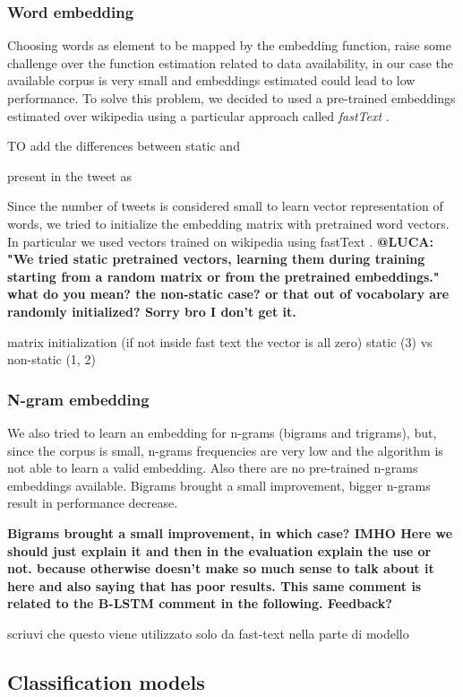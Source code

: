 \subsubsection{Word embedding}
Choosing words as element to be mapped by the embedding function, raise some challenge over the function estimation related to data availability, in our case the available corpus is very small and embeddings estimated could lead to low performance.
To solve this problem, we decided to used a pre-trained embeddings estimated over wikipedia using a particular approach called \emph{fastText} \cite{bojanowski2016enriching}.

TO add the differences between static and 

present in the tweet as 

Since the number of tweets is considered small to learn vector representation of words, we tried to initialize the embedding matrix with pretrained word vectors.
In particular we used vectors trained on wikipedia using fastText \cite{bojanowski2016enriching}.
\textbf{@LUCA: "We tried static pretrained vectors, learning them during training starting from a random matrix or from the pretrained embeddings." what do you mean? the non-static case? or that out of vocabolary are randomly initialized? Sorry bro I don't get it. }

matrix initialization (if not inside fast text the vector is all zero)
static (3) vs non-static (1, 2)


\subsubsection{N-gram embedding}
We also tried to learn an embedding for n-grams (bigrams and trigrams), but, since the corpus is small, n-grams frequencies are very low and the algorithm is not able to learn a valid embedding.
Also there are no pre-trained n-grams embeddings available.
Bigrams brought a small improvement, bigger n-grams result in performance decrease.

\textbf{Bigrams brought a small improvement, in which case? IMHO Here we should just explain it and then in the evaluation explain the use or not. because otherwise doesn't make so much sense to talk about it here and also saying that has poor results. This same comment is related to the B-LSTM comment in the following. Feedback?}

scriuvi che questo viene utilizzato solo da fast-text nella parte di modello


\subsection{Classification models} \label{subsec:classificationModel}


